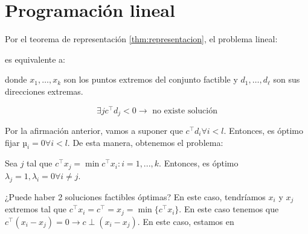 \newpage
\section{Programación lineal}

Por el teorema de representación \ref{thm:representacion}, el problema lineal:


\begin{ioprob}
\end{ioprob}

es equivalente a:

\begin{ioprob}
\end{ioprob}

donde $x_1,\ldots, x_k$ son los puntos extremos del conjunto factible y  $d_1,\ldots,d_\ell$ son sus direcciones extremas.



\[\exists j c^\top d_j < 0 \to \text{ no existe solución}\]

Por la afirmación anterior, vamos a suponer que $c^\top d_i ∀i < l$. Entonces, es óptimo fijar $µ_i = 0∀i<l$. De esta manera, obtenemos el problema:
\begin{ioprob}
\end{ioprob}

Sea $j$ tal que $c^\top x_j = \min{c^\top x_i : i = 1,..., k}$. Entonces, es óptimo $λ_j = 1, λ_i = 0 ∀i≠j$.


\begin{figure}[h]
\centering
{}
\end{figure}


¿Puede haber 2 soluciones factibles óptimas? En este caso, tendríamos $x_i$ y $x_j$ extremos tal que $c^\top x_i = c^\top = x_j = \min\{c^\top x_i \}$. En este caso tenemos que $c^\top(x_i - x_j) = 0 \to c\perp (x_i-x_j)$. En este caso, estamos en


